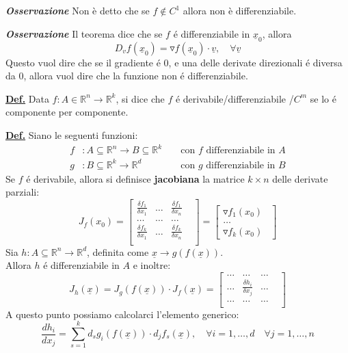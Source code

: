 \documentclass[a4paper,10pt]{article} %
\renewcommand{\b}[1]{%
    {\textbf{#1}}}
\renewcommand{\v}[1]{%
    {\underline{#1}}}
\newcommand{\ldef}[1]{%
    {\smallbreak\par\tiny\textbf{\underline{Def.}} {#1} \smallbreak}}
\newcommand{\loss}[1]{%
    {\smallbreak\par\tiny\emph{\textbf{Osservazione}} {#1} \par}}
\begin{document}
\begin{multicols}{6}
{    \loss{
        Non è detto che se $ f \not \in C^1$ allora non è differenziabile.
    }
    \loss{
        Il teorema dice che se $f$ é differenziabile in $\v{x}_0$, allora 
        \[
            D_v f(\v{x}_0) = \triangledown f(\v{x}_0) \cdot \v{v}, 
            \quad \forall\v{v} 
        \]
        Questo vuol dire che se il gradiente é 0, e una delle derivate
        direzionali é diversa da 0, allora vuol dire che la funzione non é
        differenziabile.
    }
}

\ldef{
    Data $f:A\in\mathbb{R}^n\rightarrow\mathbb{R}^k$, si dice che $f$ é
    derivabile/differenziabile /$C^m$ se lo é componente per componente.
}

\ldef{
    Siano le seguenti funzioni:
    \begin{align*}
        f&:A\subseteq\mathbb{R}^n\rightarrow B\subseteq\mathbb{R}^k && 
        \text{ con } f \text{ differenziabile in } A
        \\
        g&:B\subseteq\mathbb{R}^k\rightarrow \mathbb{R}^d && \text{ con }
        g \text{ differenziabile in } B
    \end{align*}
    Se $f$ é derivabile, allora si definisce \b{jacobiana} la matrice $k \times
    n$  delle derivate parziali:
    \[
        J_f(x_0) =
        \begin{bmatrix}
            \frac{\delta f_1}{\delta x_1} &
            \dots &
            \frac{\delta f_1}{\delta x_n} & \\
            \dots &
            \dots &
            \dots & \\
            \frac{\delta f_k}{\delta x_1} &
            \dots &
            \frac{\delta f_k}{\delta x_n} & \\
        \end{bmatrix}
        =
        \begin{bmatrix}
            \triangledown f_1(x_0) \\
            \dots  \\
            \triangledown f_k(x_0) \ \
        \end{bmatrix}
    \]
    Sia $h:A \subseteq \mathbb{R}^n \rightarrow \mathbb{R}^d$, definita
    come $\v{x} \rightarrow g(f(\v{x}))$.\\
    Allora $h$ é differenziabile in $A$ e inoltre:
    \[
        J_h(\v{x}) = J_g(f(\v{x})) \cdot J_f(\v{x}) =
        \begin{bmatrix}
            \dots &
            \dots &
            \dots & \\
            \dots & 
            \frac{\delta h_i}{\delta x_j} & 
            \dots & \\
            \dots &
            \dots &
            \dots & \\
        \end{bmatrix}
    \]
    A questo punto possiamo calcolarci l'elemento generico:
    \[
        \frac{dh_i}{dx_j} =
        \sum_{s = 1}^k d_sg_i(f(\v{x})) \cdot d_jf_s(\v{x}), 
        \quad \forall i = 1, \dots, d
        \quad \forall j = 1, \dots, n
    \]
}


\end{multicols}
\end{document}
